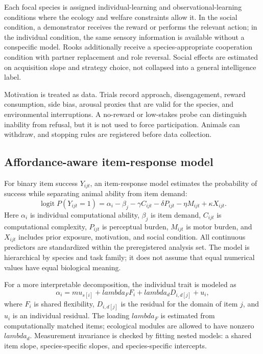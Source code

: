 \documentclass[conference]{IEEEtran}
\begin{document}
Each focal species is assigned individual-learning and observational-learning conditions where the ecology and welfare constraints allow it. In the social condition, a demonstrator receives the reward or performs the relevant action; in the individual condition, the same sensory information is available without a conspecific model. Rooks additionally receive a species-appropriate cooperation condition with partner replacement and role reversal. Social effects are estimated on acquisition slope and strategy choice, not collapsed into a general intelligence label.

Motivation is treated as data. Trials record approach, disengagement, reward consumption, side bias, arousal proxies that are valid for the species, and environmental interruptions. A no-reward or low-stakes probe can distinguish inability from refusal, but it is not used to force participation. Animals can withdraw, and stopping rules are registered before data collection.

\subsection{Affordance-aware item-response model}
For binary item success $Y_{ijt}$, an item-response model estimates the probability of success while separating animal ability from item demand:
\begin{equation}
\operatorname{logit} P(Y_{ijt}=1) =
\alpha_i - \beta_j - \gamma C_{ijt}
- \delta P_{ijt} - \eta M_{ijt} + \kappa X_{ijt}.
\label{eq:irt}
\end{equation}
Here $\alpha_i$ is individual computational ability, $\beta_j$ is item demand, $C_{ijt}$ is computational complexity, $P_{ijt}$ is perceptual burden, $M_{ijt}$ is motor burden, and $X_{ijt}$ includes prior exposure, motivation, and social condition. All continuous predictors are standardized within the preregistered analysis set. The model is hierarchical by species and task family; it does not assume that equal numerical values have equal biological meaning.

For a more interpretable decomposition, the individual trait is modeled as
\begin{equation}
\alpha_i = mu_{s[i]} + lambda_F F_i + lambda_d D_{i,d[j]} + u_i,
\label{eq:latent}
\end{equation}
where $F_i$ is shared flexibility, $D_{i,d[j]}$ is the residual for the domain of item $j$, and $u_i$ is an individual residual. The loading $lambda_F$ is estimated from computationally matched items; ecological modules are allowed to have nonzero $lambda_d$. Measurement invariance is checked by fitting nested models: a shared item slope, species-specific slopes, and species-specific intercepts.
\end{document}
